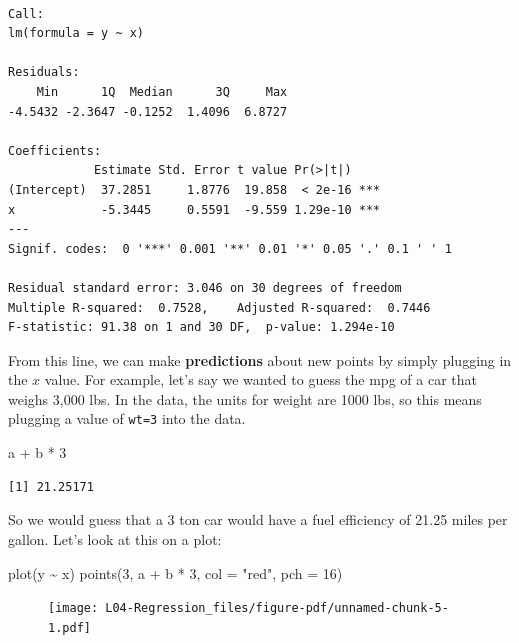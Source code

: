 \documentclass[
  letterpaper,
  DIV=11,
  numbers=noendperiod,
  oneside]{scrreprt}
\newenvironment{Shaded}{\begin{snugshade}}{\end{snugshade}}
\newcommand{\AttributeTok}[1]{\textcolor[rgb]{0.40,0.45,0.13}{#1}}
\newcommand{\DecValTok}[1]{\textcolor[rgb]{0.68,0.00,0.00}{#1}}
\newcommand{\FunctionTok}[1]{\textcolor[rgb]{0.28,0.35,0.67}{#1}}
\newcommand{\NormalTok}[1]{\textcolor[rgb]{0.00,0.23,0.31}{#1}}
\newcommand{\SpecialCharTok}[1]{\textcolor[rgb]{0.37,0.37,0.37}{#1}}
\newcommand{\StringTok}[1]{\textcolor[rgb]{0.13,0.47,0.30}{#1}}
\begin{document}
\begin{verbatim}

Call:
lm(formula = y ~ x)

Residuals:
    Min      1Q  Median      3Q     Max 
-4.5432 -2.3647 -0.1252  1.4096  6.8727 

Coefficients:
            Estimate Std. Error t value Pr(>|t|)    
(Intercept)  37.2851     1.8776  19.858  < 2e-16 ***
x            -5.3445     0.5591  -9.559 1.29e-10 ***
---
Signif. codes:  0 '***' 0.001 '**' 0.01 '*' 0.05 '.' 0.1 ' ' 1

Residual standard error: 3.046 on 30 degrees of freedom
Multiple R-squared:  0.7528,    Adjusted R-squared:  0.7446 
F-statistic: 91.38 on 1 and 30 DF,  p-value: 1.294e-10
\end{verbatim}

From this line, we can make \textbf{predictions} about new points by
simply plugging in the \(x\) value. For example, let's say we wanted to
guess the mpg of a car that weighs 3,000 lbs. In the data, the units for
weight are 1000 lbs, so this means plugging a value of \texttt{wt=3}
into the data.

\begin{Shaded}
\begin{Highlighting}[]
\NormalTok{a }\SpecialCharTok{+}\NormalTok{ b }\SpecialCharTok{*} \DecValTok{3}
\end{Highlighting}
\end{Shaded}

\begin{verbatim}
[1] 21.25171
\end{verbatim}

So we would guess that a 3 ton car would have a fuel efficiency of 21.25
miles per gallon. Let's look at this on a plot:

\begin{Shaded}
\begin{Highlighting}[]
\FunctionTok{plot}\NormalTok{(y }\SpecialCharTok{\textasciitilde{}}\NormalTok{ x)}
\FunctionTok{points}\NormalTok{(}\DecValTok{3}\NormalTok{, a }\SpecialCharTok{+}\NormalTok{ b }\SpecialCharTok{*} \DecValTok{3}\NormalTok{, }\AttributeTok{col =} \StringTok{"red"}\NormalTok{, }\AttributeTok{pch =} \DecValTok{16}\NormalTok{)}
\end{Highlighting}
\end{Shaded}

\begin{figure}[H]

{\centering \texttt{[image: L04-Regression\_files/figure-pdf/unnamed-chunk-5-1.pdf]}

}

\end{figure}
\end{document}
